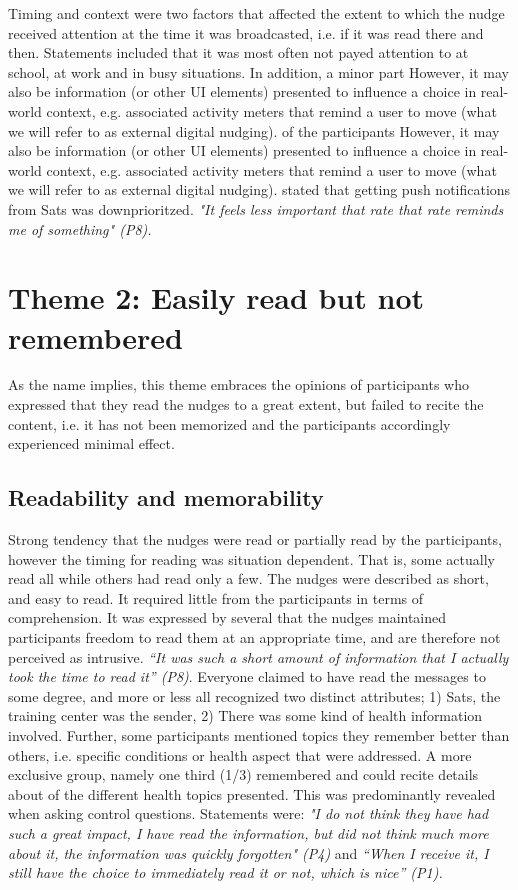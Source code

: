 Timing and context were two factors that affected the extent to which the nudge received attention at the time it was broadcasted, i.e. if it was read there and then. Statements included that it was most often not payed attention to at school, at work and in busy situations. In addition, a minor part However, it may also be information (or other UI elements) presented to influence a choice in real-world context, e.g. associated activity meters that remind a user to move (what we will refer to as external digital nudging).  of the participants However, it may also be information (or other UI elements) presented to influence a choice in real-world context, e.g. associated activity meters that remind a user to move (what we will refer to as external digital nudging).  stated that getting push notifications from Sats was downprioritzed.\textit{ "It feels less important that rate that rate reminds me of something" (P8). }


\section{Theme 2: Easily read but not remembered}
As the name implies, this theme embraces the opinions of participants who expressed that they read the nudges to a great extent, but failed to recite the content, i.e. it has not been memorized and the participants accordingly experienced minimal effect. 

\subsection{Readability and memorability}

Strong tendency that the nudges were read or partially read by the participants, however the timing for reading was situation dependent. That is, some actually read all while others had read only a few.  
The nudges were described as short, and easy to read. It required little from the participants in terms of comprehension. It was expressed by several that the nudges maintained participants freedom to read them at an appropriate time, and are therefore not perceived as intrusive. \textit{“It was such a short amount of information that I actually took the time to read it” (P8)}. Everyone claimed to have read the messages to some degree, and more or less all recognized two distinct attributes; 1) Sats, the training center was the sender, 2) There was some kind of health information involved. Further, some participants mentioned topics they remember better than others, i.e. specific conditions or health aspect that were addressed. A more exclusive group, namely one third (1/3) remembered and could recite details about of the different health topics presented. This was predominantly revealed when asking control questions. Statements were:  \textit{"I do not think they have had such a great impact, I have read the information, but did not think much more about it, the information was quickly forgotten" (P4)} and \textit{“When I receive it, I still have the choice to immediately read it or not, which is nice” (P1). }


